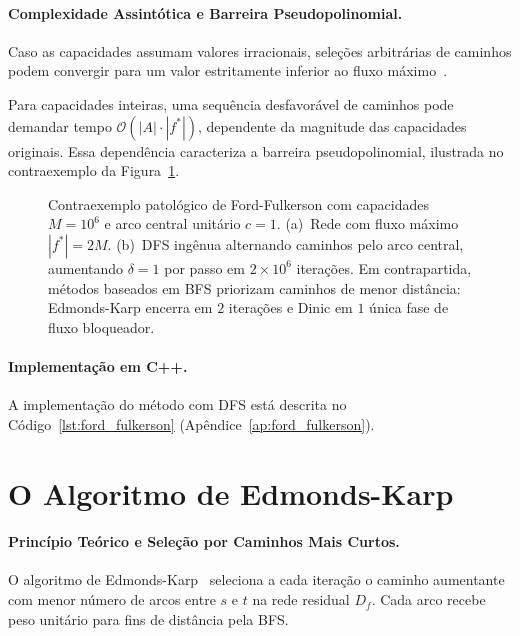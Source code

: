 \paragraph{Complexidade Assintótica e Barreira Pseudopolinomial.}
Caso as capacidades assumam valores irracionais, seleções arbitrárias de caminhos podem convergir para um valor estritamente inferior ao fluxo máximo~\cite{cook1998combinatorial}.

Para capacidades inteiras, uma sequência desfavorável de caminhos pode demandar tempo $\mathcal{O}(|A| \cdot |f^*|)$, dependente da magnitude das capacidades originais. Essa dependência caracteriza a barreira pseudopolinomial, ilustrada no contraexemplo da Figura~\ref{fig:ford_fulkerson_patologico}.

\begin{figure}[!ht]
\centering

\caption{Contraexemplo patológico de Ford-Fulkerson com capacidades $M = 10^6$ e arco central unitário $c=1$. (a)~Rede com fluxo máximo $|f^*| = 2M$. (b)~DFS ingênua alternando caminhos pelo arco central, aumentando $\delta=1$ por passo em $2 \times 10^6$ iterações. Em contrapartida, métodos baseados em BFS priorizam caminhos de menor distância: Edmonds-Karp encerra em $2$ iterações e Dinic em $1$ única fase de fluxo bloqueador.}
\label{fig:ford_fulkerson_patologico}
\end{figure}

\paragraph{Implementação em C++.}
A implementação do método com DFS está descrita no Código~\ref{lst:ford_fulkerson} (Apêndice~\ref{ap:ford_fulkerson}).


\section{O Algoritmo de Edmonds-Karp}\label{sec:edmonds_karp}

\paragraph{Princípio Teórico e Seleção por Caminhos Mais Curtos.}
O algoritmo de Edmonds-Karp~\cite{edmonds1972theoretical, dinic1970algorithm} seleciona a cada iteração o caminho aumentante com menor número de arcos entre $s$ e $t$ na rede residual $D_f$. Cada arco recebe peso unitário para fins de distância pela BFS.

